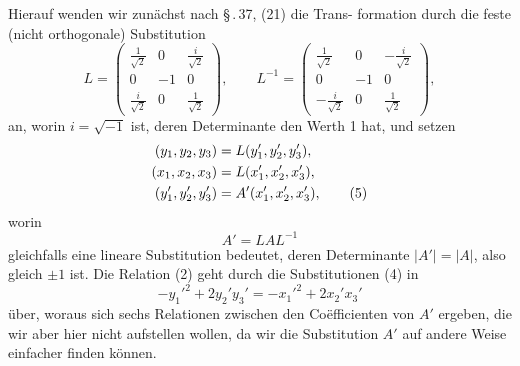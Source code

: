\documentclass[12pt,a4paper]{article}
\theoremstyle{plain}
\theoremstyle{definition}
\theoremstyle{remark}
\begin{document}
Hierauf wenden wir zun\"achst nach \S\,.\,37, (21) die Trans-
formation durch die feste (nicht orthogonale) Substitution
\begin{equation}\label{eq:49_3}
L = \begin{pmatrix}
\frac{1}{\sqrt{2}} & 0 & \frac{i}{\sqrt{2}}\\[4pt]
0 & -1 & 0\\[4pt]
\frac{i}{\sqrt{2}} & 0 & \frac{1}{\sqrt{2}}
\end{pmatrix},\qquad
L^{-1} = \begin{pmatrix}
\frac{1}{\sqrt{2}} & 0 & -\frac{i}{\sqrt{2}}\\[4pt]
0 & -1 & 0\\[4pt]
-\frac{i}{\sqrt{2}} & 0 & \frac{1}{\sqrt{2}}
\end{pmatrix},\tag{3}
\end{equation}
an, worin $i = \sqrt{-1}$ ist, deren Determinante den Werth 1 hat,
und setzen
\begin{align}
(y_1, y_2, y_3) &= L(y_1', y_2', y_3'),\notag\\
(x_1, x_2, x_3) &= L(x_1', x_2', x_3'),\notag\\
(y_1', y_2', y_3') &= A'(x_1', x_2', x_3'),\label{eq:49_5}\tag{5}
\end{align}
worin
\begin{equation}\label{eq:49_6}
A' = LAL^{-1}\tag{6}
\end{equation}
gleichfalls eine lineare Substitution bedeutet, deren Determinante
$|A'| = |A|$, also gleich $\pm 1$ ist. Die Relation (2) geht durch die
Substitutionen (4) in
\begin{equation}\label{eq:49_7}
-y_1'^2 + 2y_2'y_3' = -x_1'^2 + 2x_2'x_3'\tag{7}
\end{equation}
\"uber, woraus sich sechs Relationen zwischen den Co\"efficienten
von $A'$ ergeben, die wir aber hier nicht aufstellen wollen, da
wir die Substitution $A'$ auf andere Weise einfacher finden
k\"onnen.
\end{document}
